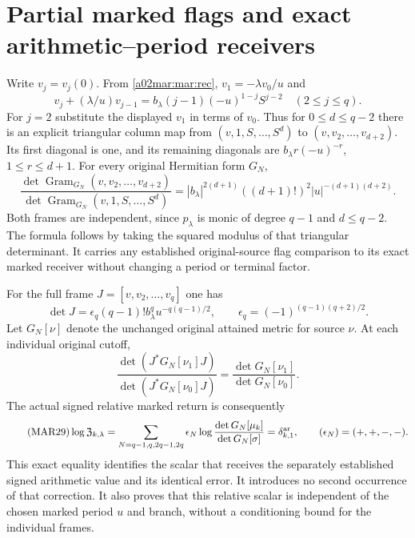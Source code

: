 \section{Partial marked flags and exact arithmetic--period receivers}
Write $v_j=v_j(0)$. From \eqref{a02mar:mar:rec},
$v_1=-\lambda v_0/u$ and
\[
 v_j+(\lambda/u)v_{j-1}=b_\lambda(j-1)(-u)^{1-j}S^{j-2}
           \quad(2\le j\le q).
\]
For $j=2$ substitute the displayed $v_1$ in terms of $v_0$.
Thus for $0\le d\le q-2$ there is an explicit triangular
column map from $(v,1,S,\ldots,S^d)$ to
$(v,v_2,\ldots,v_{d+2})$. Its first diagonal is one, and its
remaining diagonals are $b_\lambda r(-u)^{-r}$,
$1\le r\le d+1$. For every original Hermitian form $G_N$,
\begin{equation}\tag{MAR27}\label{a02mar:mar:partialgram}
 \frac{\det\operatorname{Gram}_{G_N}(v,v_2,\ldots,v_{d+2})}
      {\det\operatorname{Gram}_{G_N}(v,1,S,\ldots,S^d)}
 =|b_\lambda|^{2(d+1)}((d+1)!)^2|u|^{-(d+1)(d+2)}.
\end{equation}
Both frames are independent, since $p_\lambda$ is monic of
degree $q-1$ and $d\le q-2$. The formula follows by taking
the squared modulus of that triangular determinant. It carries
any established original-source flag comparison to its exact
marked receiver without changing a period or terminal factor.

For the full frame $J=[v,v_2,\ldots,v_q]$ one has
\[
 \det J=\epsilon_q(q-1)!b_\lambda^q u^{-q(q-1)/2},\qquad
 \epsilon_q=(-1)^{(q-1)(q+2)/2}.
\]
Let $G_N[\nu]$ denote the unchanged original attained metric for
source $\nu$. At each individual original cutoff,
\begin{equation}\tag{MAR28}\label{a02mar:mar:relative}
 \frac{\det(J^*G_N[\nu_1]J)}{\det(J^*G_N[\nu_0]J)}
       =\frac{\det G_N[\nu_1]}{\det G_N[\nu_0]}.
\end{equation}
The actual signed relative marked return is consequently
\begin{equation}\tag{MAR29}\label{a02mar:mar:Z}
 \log\mathfrak Z_{k,\lambda}
 =\sum_{N=q-1,q,2q-1,2q}\epsilon_N
       \log\frac{\det G_N[\mu_k]}{\det G_N[\sigma]}
 =\delta_{k,1}^{\rm ar},\qquad(\epsilon_N)=(+,+,-,-).
\end{equation}
This exact equality identifies the scalar that receives the
separately established signed arithmetic value and its identical
error. It introduces no second occurrence of that correction.
It also proves that this relative scalar is independent of the
chosen marked period $u$ and branch, without a conditioning bound
for the individual frames.

